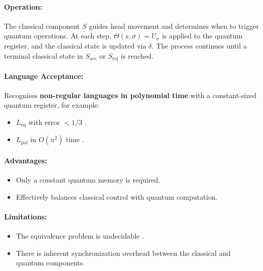 \paragraph{Operation:}  
The classical component \( S \) guides head movement and determines when to trigger quantum operations. At each step, \( \Theta(s, \sigma) = U_\sigma \) is applied to the quantum register, and the classical state is updated via \( \delta \). The process continues until a terminal classical state in \( S_{\text{acc}} \) or \( S_{\text{rej}} \) is reached.

\paragraph{Language Acceptance:}  
Recognises \textbf{non-regular languages in polynomial time} with a constant-sized quantum register, for example:
\begin{itemize}
    \item \( L_{\text{eq}} \) with error \( < 1/3 \) \cite{ambainis2002quantum}.
    \item \( L_{\text{pal}} \) in \( O(n^2) \) time \cite{yamakami2014constant}.
\end{itemize}

\paragraph{Advantages:}
\begin{itemize}
    \item Only a constant quantum memory is required.
    \item Effectively balances classical control with quantum computation.
\end{itemize}

\paragraph{Limitations:}
\begin{itemize}
    \item The equivalence problem is undecidable \cite{hirvensalo2008}.
    \item There is inherent synchronization overhead between the classical and quantum components.
\end{itemize}

